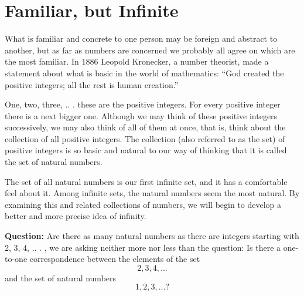 \clearpage
\section{Familiar, but Infinite} \label{Infinite}

What is familiar and concrete to one person may be foreign and abstract to another, but as far as numbers are concerned we probably all agree on which are the most familiar. In 1886 Leopold Kronecker, a number theorist, made a statement about what is basic in the world of mathematics: ``God created the positive integers; all the rest is human creation.''

One, two, three, .. . these are the positive integers. For every positive integer there is a next bigger one. Although we may think of these positive integers successively, we may also think of all of them at once, that is, think about the collection of all positive integers. The collection (also referred to as the set) of positive integers is so basic and natural to our way of thinking that it is called the set of natural numbers.

The set of all natural numbers is our first infinite set, and it has a comfortable feel about it. Among infinite sets, the natural numbers seem the most natural. By examining this and related collections of numbers, we will begin to develop a better and more precise idea of infinity.


\noindent \textbf{Question:} Are there as many natural numbers as there are integers starting with 2, 3, 4, .. . , we are asking neither more nor less than the question: Is there a one-to-one correspondence
between the elements of the set 
\[2, 3, 4, .. .\]
and the set of natural numbers
\[1, 2, 3, .. . ?\]
\clearpage

